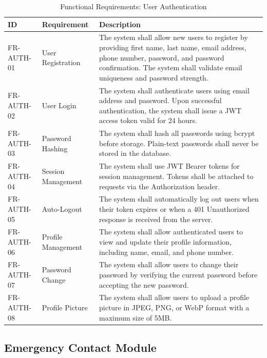 \begin{table}[H]
  \centering
  \caption{Functional Requirements: User Authentication}
  \label{tab:fr-auth}
  \begin{tabularx}{\textwidth}{@{}l l X@{}}
    \toprule
    \textbf{ID} & \textbf{Requirement} & \textbf{Description} \\
    \midrule
    FR-AUTH-01 & User Registration & The system shall allow new users to register by providing first name, last name, email address, phone number, password, and password confirmation. The system shall validate email uniqueness and password strength. \\
    FR-AUTH-02 & User Login & The system shall authenticate users using email address and password. Upon successful authentication, the system shall issue a JWT access token valid for 24 hours. \\
    FR-AUTH-03 & Password Hashing & The system shall hash all passwords using bcrypt before storage. Plain-text passwords shall never be stored in the database. \\
    FR-AUTH-04 & Session Management & The system shall use JWT Bearer tokens for session management. Tokens shall be attached to requests via the Authorization header. \\
    FR-AUTH-05 & Auto-Logout & The system shall automatically log out users when their token expires or when a 401 Unauthorized response is received from the server. \\
    FR-AUTH-06 & Profile Management & The system shall allow authenticated users to view and update their profile information, including name, email, and phone number. \\
    FR-AUTH-07 & Password Change & The system shall allow users to change their password by verifying the current password before accepting the new password. \\
    FR-AUTH-08 & Profile Picture & The system shall allow users to upload a profile picture in JPEG, PNG, or WebP format with a maximum size of 5MB. \\
    \bottomrule
  \end{tabularx}
\end{table}

\subsection{Emergency Contact Module}

